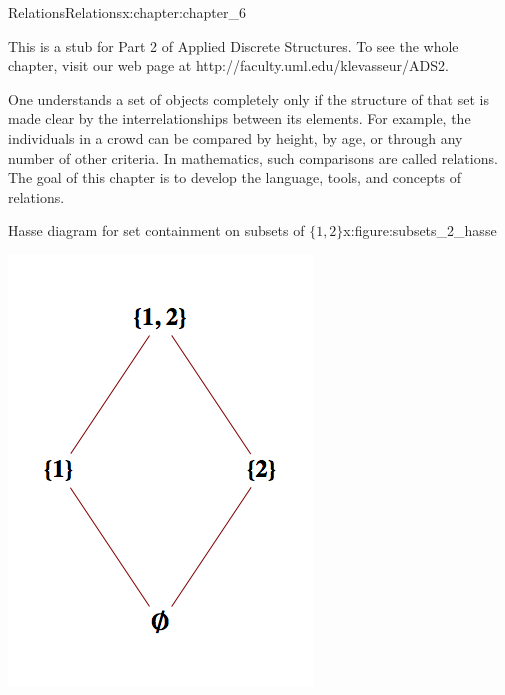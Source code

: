 \documentclass[twoside,10pt,]{book}
\numberwithin{equation}{section}
\begin{document}
\begin{chapterptx}{Relations}{}{Relations}{}{}{x:chapter:chapter_6}
\begin{introduction}{}%
This is a stub for Part 2 of Applied Discrete Structures. To see the whole chapter, visit our web page at http:\slash{}\slash{}faculty.uml.edu\slash{}klevasseur\slash{}ADS2.%
\par
One understands a set of objects completely only if the structure of that set is made clear by the interrelationships between its elements. For example, the individuals in a crowd can be compared by height, by age, or through any number of other criteria. In mathematics, such comparisons are called relations. The goal of this chapter is to develop the language, tools, and concepts of relations.%
\end{introduction}%
\begin{figureptx}{Hasse diagram for set containment on subsets of \(\{1,2\}\)}{x:figure:subsets_2_hasse}{}%
\begin{image}{0}{1}{0}%
\includegraphics[width=\linewidth]{images/subsets_2_hasse.png}

\end{image}
\end{figureptx}
\end{chapterptx}
\end{document}
